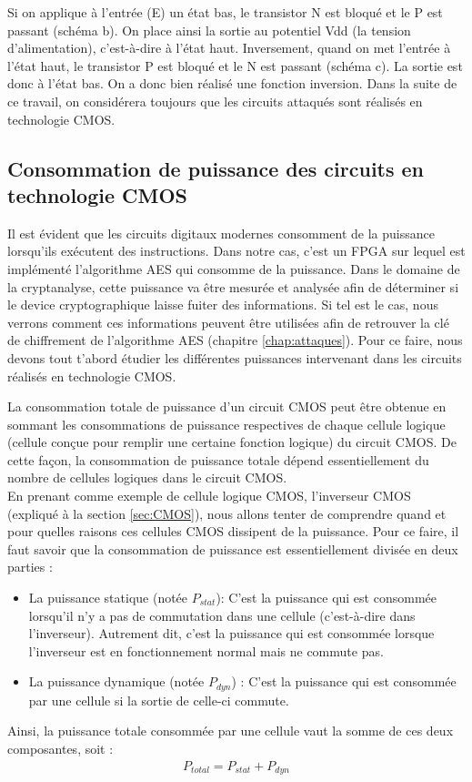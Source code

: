 \documentclass[oneside]{book}
\begin{document}
Si on applique à l'entrée (E) un état bas, le transistor N est bloqué et le P est passant (schéma b). On place ainsi la sortie au potentiel Vdd (la tension d'alimentation), c'est-à-dire à l'état haut. Inversement, quand on met l'entrée à l'état haut, le transistor P est bloqué et le N est passant (schéma c). La sortie est donc à l'état bas. On a donc bien réalisé une fonction inversion. Dans la suite de ce travail, on considérera toujours que les circuits attaqués sont réalisés en technologie CMOS.


\subsection{Consommation de puissance des circuits en technologie CMOS}
\label{sec:puissance}

Il est évident que les circuits digitaux modernes consomment de la puissance lorsqu'ils exécutent des instructions. Dans notre cas, c'est un FPGA sur lequel est implémenté l'algorithme AES qui consomme de la puissance. Dans le domaine de la cryptanalyse, cette puissance va être mesurée et analysée afin de déterminer si le device cryptographique laisse fuiter des informations. Si tel est le cas, nous verrons comment ces informations peuvent être utilisées afin de retrouver la clé de chiffrement de l'algorithme AES (chapitre \ref{chap:attaques}). Pour ce faire, nous devons tout t'abord étudier les différentes puissances intervenant dans les circuits réalisés en technologie CMOS.

La consommation totale de puissance d'un circuit CMOS peut être obtenue en sommant les consommations de puissance respectives de chaque cellule logique (cellule conçue pour remplir une certaine fonction logique) du circuit CMOS. De cette façon, la consommation de puissance totale dépend essentiellement du nombre de cellules logiques dans le circuit CMOS. \\
En prenant comme exemple de cellule logique CMOS, l'inverseur CMOS (expliqué à la section \ref{sec:CMOS}), nous allons tenter de comprendre quand et pour quelles raisons ces cellules CMOS dissipent de la puissance. Pour ce faire, il faut savoir que la consommation de puissance est essentiellement divisée en deux parties : 
\begin{itemize}
\item La puissance statique (notée $P_{stat}$): C'est la puissance qui est consommée lorsqu'il n'y a pas de commutation dans une cellule (c'est-à-dire dans l'inverseur). Autrement dit, c'est la puissance qui est consommée lorsque l'inverseur est en fonctionnement normal mais ne commute pas.
\item La puissance dynamique (notée $P_{dyn}$) : C'est la puissance qui est consommée par une cellule si la sortie de celle-ci commute. 
\end{itemize}
Ainsi, la puissance totale consommée par une cellule vaut la somme de ces deux composantes, soit :
\begin{gather}
	P_{total} = P_{stat} + P_{dyn}
\end{gather}
\end{document}
